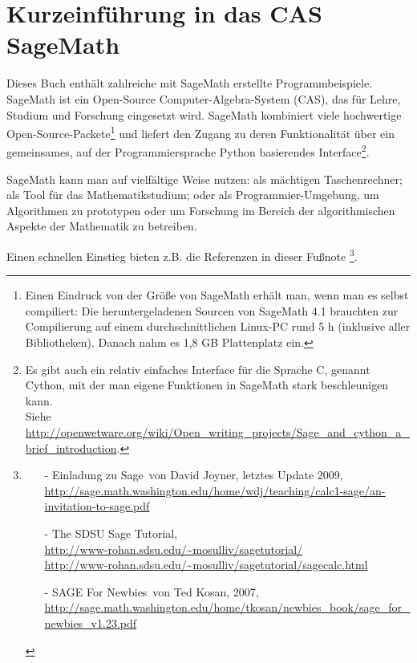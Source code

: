 
\newpage
\hypertarget{appendix-using-sage}{}
\section{Kurzeinführung in das CAS SageMath}
\label{s:appendix-using-sage}



Dieses Buch enthält zahlreiche mit SageMath erstellte Programmbeispiele. SageMath ist
ein Open-Source Computer-Algebra-System (CAS), das für Lehre, Studium und Forschung
eingesetzt wird.
SageMath kombiniert viele hochwertige Open-Source-Packete\footnote{%
Einen Eindruck von der Größe von SageMath erhält man, wenn man es selbst compiliert:
Die heruntergeladenen Sourcen von SageMath 4.1 brauchten zur Compilierung auf einem
durchschnittlichen Linux-PC rund 5 h (inklusive aller Bibliotheken).
Danach nahm es 1,8 GB Plattenplatz ein.
}
und liefert den Zugang zu deren Funktionalität über ein gemeinsames, auf der
Programmiersprache Python basierendes Interface\footnote{%
Es gibt auch ein relativ einfaches Interface für die Sprache C, genannt Cython,
mit der man eigene Funktionen in SageMath stark beschleunigen kann.\\
Siehe \url{http://openwetware.org/wiki/Open_writing_projects/Sage_and_cython_a_brief_introduction}.
}.

SageMath kann man auf vielfältige Weise nutzen:
als mächtigen Taschenrechner; als Tool für das Mathematikstudium;
oder als Programmier-Umgebung, um Algorithmen zu prototypen oder um Forschung im
Bereich der algorithmischen Aspekte der Mathematik zu betreiben.

Einen schnellen Einstieg bieten z.B. die Referenzen in dieser Fußnote%
\footnote{%
\begin{itemize}
\item[-] \glqq Einladung zu Sage\grqq~von David Joyner, letztes Update 2009,\\
  \url{http://sage.math.washington.edu/home/wdj/teaching/calc1-sage/an-invitation-to-sage.pdf}
\item[-]\glqq The SDSU Sage Tutorial\grqq,\\
  \url{http://www-rohan.sdsu.edu/~mosulliv/sagetutorial/}\\
  \url{http://www-rohan.sdsu.edu/~mosulliv/sagetutorial/sagecalc.html}
 \item[-]\glqq SAGE For Newbies\grqq~von Ted Kosan, 2007,\\
  \url{http://sage.math.washington.edu/home/tkosan/newbies_book/sage_for_newbies_v1.23.pdf} \end{itemize}}.

